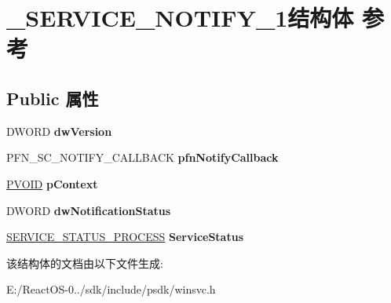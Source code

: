 \hypertarget{struct___s_e_r_v_i_c_e___n_o_t_i_f_y__1}{}\section{\+\_\+\+S\+E\+R\+V\+I\+C\+E\+\_\+\+N\+O\+T\+I\+F\+Y\+\_\+1结构体 参考}
\label{struct___s_e_r_v_i_c_e___n_o_t_i_f_y__1}
\subsection*{Public 属性}
\begin{DoxyCompactItemize}
\item 
\mbox{\label{struct___s_e_r_v_i_c_e___n_o_t_i_f_y__1_af0205dc8f3302b510a0288f8575d0d41}} 
D\+W\+O\+RD {\bfseries dw\+Version}
\item 
\mbox{\label{struct___s_e_r_v_i_c_e___n_o_t_i_f_y__1_abf65e514c5619be692ff6d62f6e23aa0}} 
P\+F\+N\+\_\+\+S\+C\+\_\+\+N\+O\+T\+I\+F\+Y\+\_\+\+C\+A\+L\+L\+B\+A\+CK {\bfseries pfn\+Notify\+Callback}
\item 
\mbox{\label{struct___s_e_r_v_i_c_e___n_o_t_i_f_y__1_afd56919f915f88b6242807a686f8b0c0}} 
\hyperlink{interfacevoid}{P\+V\+O\+ID} {\bfseries p\+Context}
\item 
\mbox{\label{struct___s_e_r_v_i_c_e___n_o_t_i_f_y__1_a0096da1aebee9c6d871f3e5d44ce2e97}} 
D\+W\+O\+RD {\bfseries dw\+Notification\+Status}
\item 
\mbox{\label{struct___s_e_r_v_i_c_e___n_o_t_i_f_y__1_aa9030301abdd0e91c4ae39f22fe86df6}} 
\hyperlink{struct___s_e_r_v_i_c_e___s_t_a_t_u_s___p_r_o_c_e_s_s}{S\+E\+R\+V\+I\+C\+E\+\_\+\+S\+T\+A\+T\+U\+S\+\_\+\+P\+R\+O\+C\+E\+SS} {\bfseries Service\+Status}
\end{DoxyCompactItemize}


该结构体的文档由以下文件生成\+:\begin{DoxyCompactItemize}
\item 
E\+:/\+React\+O\+S-\/0../sdk/include/psdk/winsvc.\+h\end{DoxyCompactItemize}
